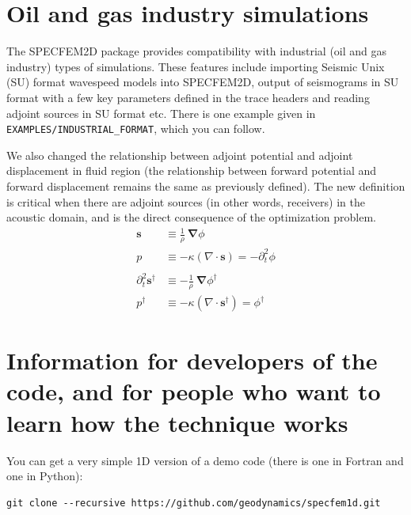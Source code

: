 \documentclass[oneside,english,onecolumn,letterpaper]{book}
\begin{document}
\chapter{Oil and gas industry simulations}


The SPECFEM2D package provides compatibility with industrial (oil and gas industry) types of simulations.
These features include importing Seismic Unix (SU) format wavespeed models into SPECFEM2D,
output of seismograms in SU format with a few key parameters defined in the trace headers
and reading adjoint sources in SU format etc.
There is one example given in \texttt{EXAMPLES/INDUSTRIAL\_FORMAT}, which you can follow.

We also changed the relationship between adjoint potential and adjoint displacement in fluid region
(the relationship between forward potential and forward displacement remains the same as previously defined).
The new definition is critical when there are adjoint sources (in other words, receivers) in the acoustic domain,
and is the direct consequence of the optimization problem.
%
\begin{align*}
\mathbf{s} &\equiv \frac{1}{\rho} \: \mathbf{\nabla}\phi \\
p &\equiv -\kappa\left(\nabla\cdot\mathbf{s}\right) = -\partial_t^2\phi \\
&\\
\partial_t^2\mathbf{s}^\dagger &\equiv -\frac{1}{\rho} \: \mathbf{\nabla}\phi^\dagger \\
p^\dagger &\equiv -\kappa\left(\nabla\cdot\mathbf{s}^\dagger\right) = \phi^\dagger
\end{align*}



\chapter{Information for developers of the code, and for people who want to learn how the technique works}\label{cha:developers}


You can get a very simple 1D version of a demo code (there is one in Fortran and one in Python):
\begin{verbatim}
git clone --recursive https://github.com/geodynamics/specfem1d.git
\end{verbatim}
\end{document}

